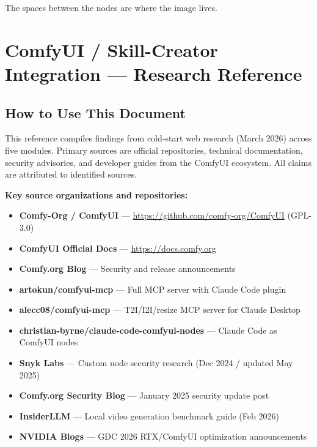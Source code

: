 \documentclass[11pt,letterpaper]{article}
\newcommand{\stageheader}[2]{%
  \noindent\colorbox{#2}{\makebox[\textwidth][l]{%
    \textcolor{white}{\bfseries\sffamily\hspace{6pt}#1\hspace{6pt}}}}%
  \vspace{0.5em}\par%
}
\begin{document}
The spaces between the nodes are where the image lives.

\newpage

\stageheader{STAGE 2 --- RESEARCH REFERENCE}{secondary}

\section{ComfyUI / Skill-Creator Integration --- Research Reference}

\subsection{How to Use This Document}

This reference compiles findings from cold-start web research (March 2026) across five
modules. Primary sources are official repositories, technical documentation, security
advisories, and developer guides from the ComfyUI ecosystem. All claims are attributed
to identified sources.

\textbf{Key source organizations and repositories:}
\begin{itemize}[leftmargin=1.5em]
  \item \textbf{Comfy-Org / ComfyUI} --- \url{https://github.com/comfy-org/ComfyUI} (GPL-3.0)
  \item \textbf{ComfyUI Official Docs} --- \url{https://docs.comfy.org}
  \item \textbf{Comfy.org Blog} --- Security and release announcements
  \item \textbf{artokun/comfyui-mcp} --- Full MCP server with Claude Code plugin
  \item \textbf{alecc08/comfyui-mcp} --- T2I/I2I/resize MCP server for Claude Desktop
  \item \textbf{christian-byrne/claude-code-comfyui-nodes} --- Claude Code as ComfyUI nodes
  \item \textbf{Snyk Labs} --- Custom node security research (Dec 2024 / updated May 2025)
  \item \textbf{Comfy.org Security Blog} --- January 2025 security update post
  \item \textbf{InsiderLLM} --- Local video generation benchmark guide (Feb 2026)
  \item \textbf{NVIDIA Blogs} --- GDC 2026 RTX/ComfyUI optimization announcements
\end{itemize}
\end{document}

